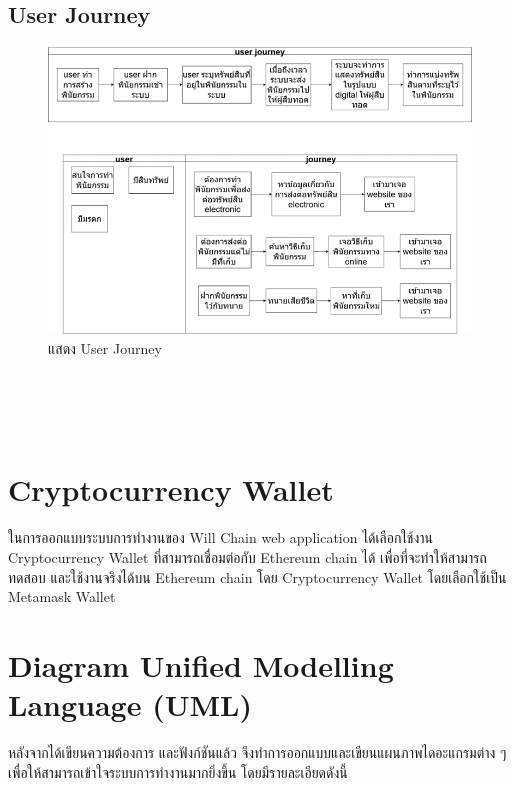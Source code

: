 \documentclass[12pt,oneside,openright,a4paper]{cpe-thai-project}
\begin{document}
\subsection{User Journey}
	\begin{figure}[h]
		\centering
		\includegraphics[scale=0.8]{UserJourney}
		\caption{แสดง User Journey}
	\end{figure}
\FloatBarrier
\hfill\\
\hfill\\
\hfill\\
\section{Cryptocurrency Wallet}
\tab ในการออกแบบระบบการทํางานของ Will Chain web application ได้เลือกใช้งาน Cryptocurrency Wallet ที่สามารถเชื่อมต่อกับ
Ethereum chain ได้ เพื่อที่จะทําให้สามารถทดสอบ และใช้งานจริงได้บน Ethereum chain โดย Cryptocurrency Wallet โดยเลือกใช้เป็น Metamask Wallet

\section{Diagram Unified Modelling Language (UML)}
\tab หลังจากได้เขียนความต้องการ และฟังก์ชันแล้ว จึงทำการออกแบบและเขียนแผนภาพไดอะแกรมต่าง ๆ เพื่อให้สามารถเข้าใจระบบการทำงานมากยิ่งขึ้น โดยมีรายละเอียดดังนี้
\end{document}
